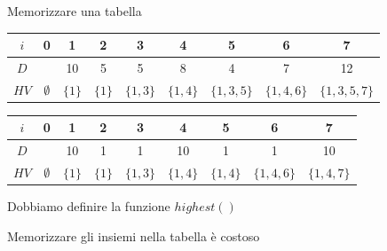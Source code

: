 \begin{frame}{Memorizzare una tabella}

\small
\medskip
\begin{tabular}{|c|c|c|c|c|c|c|c|c|}
\hline
$i$ & 0 & 1 & 2 & 3 & 4 & 5 & 6 & 7 \\\hline
$D$ &   & 10 & 5 & 5 & 8 & 4 & 7 & 12 \\\hline
$HV$ & $\emptyset$ & $\{ 1 \}$ & $\{ 1 \}$ & $\{ 1,3 \}$ & $\{ 1,4 \}$ & $\{ 1,3,5 \}$ & $ \{ 1,4,6 \}$ & $\{ 1,3,5,7 \}$ \\\hline
\end{tabular}

\medskip
\begin{tabular}{|c|c|c|c|c|c|c|c|c|}
\hline
$i$ & 0 & 1 & 2 & 3 & 4 & 5 & 6 & 7 \\\hline
$D$ &   & 10 & 1 & 1 & 10 & 1 & 1 & 10 \\\hline
$HV$ & $\emptyset$ & $\{ 1 \}$ & $\{ 1 \}$ & $\{ 1,3 \}$ & $\{ 1,4 \}$ & $\{ 1, 4 \}$ & $ \{ 1,4,6 \}$ & $\{ 1,4,7 \}$ \\\hline
\end{tabular}

\bigskip
{}
\BIL
\item Dobbiamo definire la funzione $\mathit{highest}()$
\item \alert{Memorizzare gli insiemi nella tabella è costoso}
\EIL

\end{frame}

